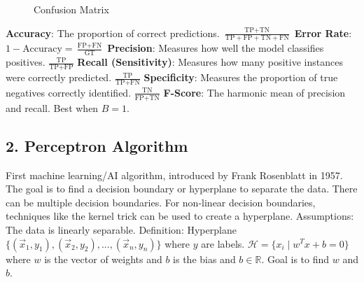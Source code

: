 \begin{figure}[h]
    \centering
    \caption{Confusion Matrix}
    \label{fig:confusion_matrix}
\end{figure}


\begin{outline}
    \1 \textbf{Accuracy}: The proportion of correct predictions. \(\frac{\text{TP} + \text{TN}}{\text{TP} + \text{FP} + \text{TN} + \text{FN}}\)
    \1 \textbf{Error Rate}: \(1 - \text{Accuracy} = \frac{\text{FP} + \text{FN}}{\text{GT}}\)
    \1 \textbf{Precision}: Measures how well the model classifies positives. \(\frac{\text{TP}}{\text{TP} + \text{FP}}\)
    \1 \textbf{Recall (Sensitivity)}: Measures how many positive instances were correctly predicted. \(\frac{\text{TP}}{\text{TP} + \text{FN}}\)
    \1 \textbf{Specificity}: Measures the proportion of true negatives correctly identified. \(\frac{\text{TN}}{\text{FP} + \text{TN}}\)
    \1 \textbf{F-Score}: The harmonic mean of precision and recall. Best when \(B = 1\).
\end{outline}

\subsection*{2. Perceptron Algorithm}
\begin{outline}
    \1 First machine learning/AI algorithm, introduced by Frank Rosenblatt in 1957.
    \1 The goal is to find a decision boundary or hyperplane to separate the data. There can be multiple decision boundaries.
    \1 For non-linear decision boundaries, techniques like the kernel trick can be used to create a hyperplane.
    \1 Assumptions:
        \2 The data is linearly separable.
    \1 Definition: Hyperplane
        \2 $\{(\vec{x}_1,y_1),(\vec{x}_2,y_2),...,(\vec{x}_n,y_n)\}$ where $y$ are labels.
        \2 $\mathcal{H}=\{x_i\mid w^Tx+b=0\}$ where $w$ is the vector of weights and $b$ is the bias and $b\in\mathbb{R}$.
        \2 Goal is to find $w$ and $b$.
\end{outline}

